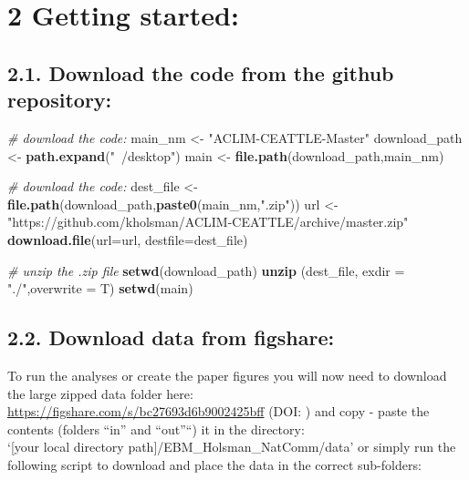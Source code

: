 \documentclass[]{article}
\newenvironment{Shaded}{\begin{snugshade}}{\end{snugshade}}
\newcommand{\KeywordTok}[1]{\textcolor[rgb]{0.13,0.29,0.53}{\textbf{{#1}}}}
\newcommand{\DataTypeTok}[1]{\textcolor[rgb]{0.13,0.29,0.53}{{#1}}}
\newcommand{\StringTok}[1]{\textcolor[rgb]{0.31,0.60,0.02}{{#1}}}
\newcommand{\CommentTok}[1]{\textcolor[rgb]{0.56,0.35,0.01}{\textit{{#1}}}}
\newcommand{\NormalTok}[1]{{#1}}
\begin{document}
\section{2 Getting started:}\label{getting-started}

\subsection{2.1. Download the code from the github
repository:}\label{download-the-code-from-the-github-repository}

\begin{Shaded}
\begin{Highlighting}[]
    \CommentTok{# download the code:}
    \NormalTok{main_nm       <-}\StringTok{ "ACLIM-CEATTLE-Master"}
    \NormalTok{download_path <-}\StringTok{ }\KeywordTok{path.expand}\NormalTok{(}\StringTok{"~/desktop"}\NormalTok{)}
    \NormalTok{main          <-}\StringTok{ }\KeywordTok{file.path}\NormalTok{(download_path,main_nm)}
   
    \CommentTok{# download the code:}
    \NormalTok{dest_file     <-}\StringTok{ }\KeywordTok{file.path}\NormalTok{(download_path,}\KeywordTok{paste0}\NormalTok{(main_nm,}\StringTok{".zip"}\NormalTok{))}
    \NormalTok{url           <-}\StringTok{"https://github.com/kholsman/ACLIM-CEATTLE/archive/master.zip"}
    \KeywordTok{download.file}\NormalTok{(}\DataTypeTok{url=}\NormalTok{url, }\DataTypeTok{destfile=}\NormalTok{dest_file)}
    
    \CommentTok{# unzip the .zip file}
    \KeywordTok{setwd}\NormalTok{(download_path)}
    \KeywordTok{unzip} \NormalTok{(dest_file, }\DataTypeTok{exdir =} \StringTok{"./"}\NormalTok{,}\DataTypeTok{overwrite =} \NormalTok{T)}
    \KeywordTok{setwd}\NormalTok{(main)}
\end{Highlighting}
\end{Shaded}

\subsection{2.2. Download data from
figshare:}\label{download-data-from-figshare}

To run the analyses or create the paper figures you will now need to
download the large zipped data folder here:\\
\url{https://figshare.com/s/bc27693d6b9002425bff} (DOI: ) and copy -
paste the contents (folders ``in'' and ``out''``) it in the directory:\\
`{[}your local directory path{]}/EBM\_Holsman\_NatComm/data' or simply
run the following script to download and place the data in the correct
sub-folders:
\end{document}
